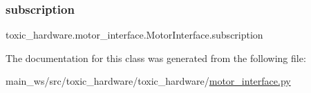 \subsubsection{\texorpdfstring{subscription}{subscription}}
{\footnotesize\ttfamily toxic\+\_\+hardware.\+motor\+\_\+interface.\+Motor\+Interface.\+subscription}



The documentation for this class was generated from the following file\+:\begin{DoxyCompactItemize}
\item 
main\+\_\+ws/src/toxic\+\_\+hardware/toxic\+\_\+hardware/\mbox{\hyperlink{motor__interface_8py}{motor\+\_\+interface.\+py}}\end{DoxyCompactItemize}
